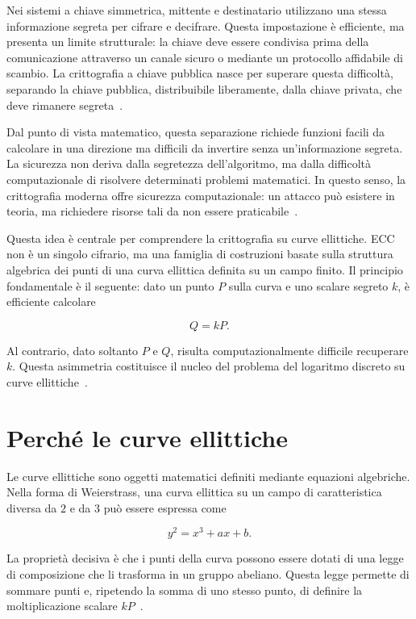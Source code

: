 \documentclass[12pt,a4paper,oneside]{report}
\begin{document}
Nei sistemi a chiave simmetrica, mittente e destinatario utilizzano una stessa informazione segreta per cifrare e decifrare. Questa impostazione è efficiente, ma presenta un limite strutturale: la chiave deve essere condivisa prima della comunicazione attraverso un canale sicuro o mediante un protocollo affidabile di scambio. La crittografia a chiave pubblica nasce per superare questa difficoltà, separando la chiave pubblica, distribuibile liberamente, dalla chiave privata, che deve rimanere segreta~\cite{margara_intro,margara_publickey}.

Dal punto di vista matematico, questa separazione richiede funzioni facili da calcolare in una direzione ma difficili da invertire senza un'informazione segreta. La sicurezza non deriva dalla segretezza dell'algoritmo, ma dalla difficoltà computazionale di risolvere determinati problemi matematici. In questo senso, la crittografia moderna offre sicurezza computazionale: un attacco può esistere in teoria, ma richiedere risorse tali da non essere praticabile~\cite{margara_intro,margara_complessita,margara_publickey}.

Questa idea è centrale per comprendere la crittografia su curve ellittiche. ECC non è un singolo cifrario, ma una famiglia di costruzioni basate sulla struttura algebrica dei punti di una curva ellittica definita su un campo finito. Il principio fondamentale è il seguente: dato un punto \(P\) sulla curva e uno scalare segreto \(k\), è efficiente calcolare

\[
Q=kP.
\]

Al contrario, dato soltanto \(P\) e \(Q\), risulta computazionalmente difficile recuperare \(k\). Questa asimmetria costituisce il nucleo del problema del logaritmo discreto su curve ellittiche~\cite{margara_ec,sec1}.

\section{Perché le curve ellittiche}

Le curve ellittiche sono oggetti matematici definiti mediante equazioni algebriche. Nella forma di Weierstrass, una curva ellittica su un campo di caratteristica diversa da \(2\) e da \(3\) può essere espressa come

\begin{equation}
    y^2 = x^3 + ax + b.
\end{equation}

La proprietà decisiva è che i punti della curva possono essere dotati di una legge di composizione che li trasforma in un gruppo abeliano. Questa legge permette di sommare punti e, ripetendo la somma di uno stesso punto, di definire la moltiplicazione scalare \(kP\)~\cite{margara_ec}.
\end{document}
